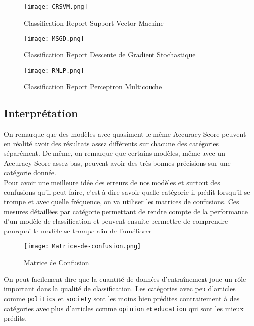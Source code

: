 \documentclass[a4paper,french,12pt]{article}
\begin{document}
\begin{figure}[!h]
    \centering
    \texttt{[image: CRSVM.png]}
    \caption{Classification Report Support Vector Machine}
\end{figure}

\begin{figure}[!h]
    \centering
    \texttt{[image: MSGD.png]}
    \caption{Classification Report Descente de Gradient Stochastique}
\end{figure}

\begin{figure}[!h]
    \centering
    \texttt{[image: RMLP.png]}
    \caption{Classification Report Perceptron Multicouche}
\end{figure}

\clearpage

\subsection{Interprétation}

On remarque que des modèles avec quasiment le même Accuracy Score peuvent en réalité avoir des résultats assez différents sur chacune des catégories séparément. De même, on remarque que certains modèles, même avec un Accuracy Score assez bas, peuvent avoir des très bonnes précisions sur une catégorie donnée.\\

Pour avoir une meilleure idée des erreurs de nos modèles et surtout des confusions qu'il peut faire, c'est-à-dire savoir quelle catégorie il prédit lorsqu'il se trompe et avec quelle fréquence, on va utiliser les matrices de confusions. Ces mesures détaillées par catégorie permettant de rendre compte de la performance d'un modèle de classification et peuvent ensuite permettre de comprendre pourquoi le modèle se trompe afin de l'améliorer.\\

\begin{figure}[!h]
    \centering
    \texttt{[image: Matrice-de-confusion.png]}
    \caption{Matrice de Confusion}
\end{figure}

On peut facilement dire que la quantité de données d'entraînement joue un rôle important dans la qualité de classification. Les catégories avec peu d'articles comme \verb|politics| et \verb|society| sont les moins bien prédites contrairement à des catégories avec plus d'articles comme \verb|opinion| et \verb|education| qui sont les mieux prédits.\\
\end{document}
